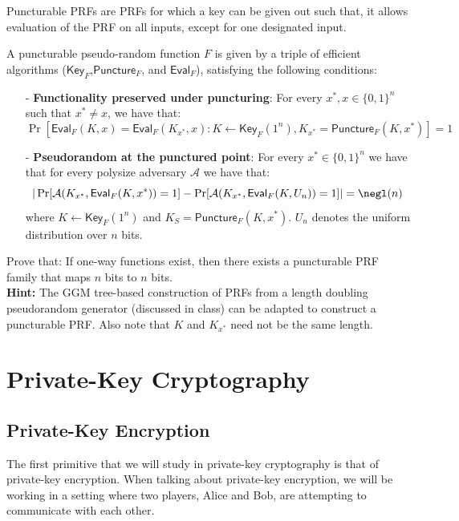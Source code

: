 \documentclass[12pt]{tufte-book}
\begin{document}
\begin{exercise} Puncturable PRFs are PRFs for which a key can be given out such that, it allows evaluation of the PRF on all inputs, except for one designated input.

\newcommand{\A}{\mathcal{A}}
    \newcommand{\F}{F}
    \newcommand{\KeyF}{\mathsf{Key}_{\F}}
    \newcommand{\PunctureF}{\mathsf{Puncture}_{\F}}
    \newcommand{\EvalF}{\mathsf{Eval}_{\F}}


    A puncturable pseudo-random function $\F$ is given by a triple of efficient algorithms ($\KeyF$,$\PunctureF$, and $\EvalF$), satisfying the following conditions:
    \begin{itemize}
        \item[-] \textbf{Functionality preserved under puncturing}: For every $x^*, x \in \{0,1\}^{n}$ such that $x^* \neq x$, we have that:
              $$\Pr[\EvalF(K,x) = \EvalF(K_{x^*},x) : K \gets \KeyF(1^n), K_{x^*} = \PunctureF(K,x^*)] = 1$$
        \item[-] \textbf{Pseudorandom at the punctured point}: For every $x^*\in \{0,1\}^n$ we have that for every polysize adversary $\A$ we have that:
              $$|\Pr[\A(K_{x^*}, \EvalF(K,x^*)) = 1] - \Pr[\A(K_{x^*}, \EvalF(K,U_n)) = 1]|= \negl(n)$$
              where $K \gets \KeyF(1^n)$ and $K_S = \PunctureF(K,x^*)$. $U_n$ denotes the uniform distribution over $n$ bits.
    \end{itemize}

    Prove that: If one-way functions exist, then there exists a puncturable PRF family that maps $n$ bits to $n$ bits. \\
    \textbf{Hint:} The GGM tree-based construction of PRFs from a length doubling pseudorandom generator (discussed in class) can be adapted to construct a puncturable PRF. Also note that $K$ and $K_{x^*}$ need not be the same length.
\end{exercise}
 \chapter{Private-Key Cryptography}
\section{Private-Key Encryption}
The first primitive that we will study in private-key cryptography is that of private-key encryption.
When talking about private-key encryption, we will be working in a setting where two players, Alice and Bob, are attempting to communicate with each other.
\end{document}
